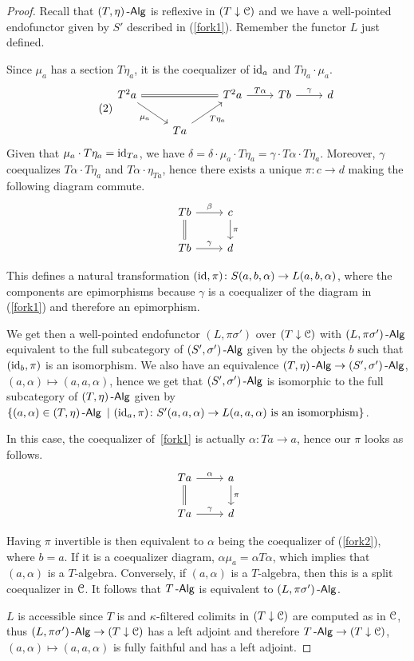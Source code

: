 \documentclass[a4paper,11pt,oneside,openany]{scrbook}
\begin{document}
\begin{proof}
	Recall that $(T,\eta)\operatorname{-\mathsf{Alg}}$ is reflexive in $(T\downarrow\operatorname{\mathcal{C}})$ and we have a well-pointed endofunctor given by $S'$ described in (\ref{fork1}). Remember the functor $L$ just defined.

	Since $\mu_a$ has a section $T\eta_a$, it is the coequalizer of $\operatorname{id}_a$ and $T\eta_a\cdot\mu_a$.
	\[
		\tag{2}\label{fork2}
		\begin{tikzcd}
			T^2a\ar[rr, equal]\ar[dr, swap, "\mu_a"]
			&& T^2a\ar[r, "T\alpha"]
			& Tb\ar[r, "\gamma"]
			& d \\
			& Ta\ar[ur, swap, "T\eta_a"]
		\end{tikzcd}
	\]
	Given that $\mu_a\cdot T\eta_a=\operatorname{id}_{Ta}$, we have $\delta=\delta\cdot\mu_a\cdot T\eta_a=\gamma\cdot T\alpha\cdot T\eta_a$. Moreover, $\gamma$ coequalizes $T\alpha\cdot T\eta_a$ and $T\alpha\cdot\eta_{Ta}$, hence there exists a unique $\pi\colon c\rightarrow d$ making the following diagram commute.
	\[
		\begin{tikzcd}
			Tb\ar[d, equal]\ar[r, "\beta"]
			& c\ar[d, "\pi"] \\
			Tb\ar[r, "\gamma"]
			& d
		\end{tikzcd}
	\]

	This defines a natural transformation $(\operatorname{id},\pi)\colon S(a,b,\alpha)\rightarrow L(a,b,\alpha)$, where the components are epimorphisms because $\gamma$ is a coequalizer of the diagram in (\ref{fork1}) and therefore an epimorphism.

	We get then a well-pointed endofunctor $(L,\pi\sigma')$ over $(T\downarrow\operatorname{\mathcal{C}})$ with $(L,\pi\sigma')\operatorname{-\mathsf{Alg}}$ equivalent to the full subcategory of $(S',\sigma')\operatorname{-\mathsf{Alg}}$ given by the objects $b$ such that $(\operatorname{id}_b,\pi)$ is an isomorphism. We also have an equivalence $(T,\eta)\operatorname{-\mathsf{Alg}}\rightarrow (S',\sigma')\operatorname{-\mathsf{Alg}}$, $(a,\alpha)\mapsto (a,a,\alpha)$, hence we get that $(S',\sigma')\operatorname{-\mathsf{Alg}}$ is isomorphic to the full subcategory of $(T,\eta)\operatorname{-\mathsf{Alg}}$ given by $\{(a,\alpha)\in (T,\eta)\operatorname{-\mathsf{Alg}}\ |\ (\operatorname{id}_a,\pi)\colon S'(a,a,\alpha)\rightarrow L(a,a,\alpha)\text{ is an isomorphism}\}$.

	In this case, the coequalizer of~\ref{fork1} is actually $\alpha\colon Ta\rightarrow a$, hence our $\pi$ looks as follows.
	\[
		\begin{tikzcd}
			Ta\ar[d, equal]\ar[r, "\alpha"]
			& a\ar[d, "\pi"] \\
			Ta\ar[r, "\gamma"]
			& d
		\end{tikzcd}
	\]

	Having $\pi$ invertible is then equivalent to $\alpha$ being the coequalizer of (\ref{fork2}), where $b=a$. If it is a coequalizer diagram, $\alpha\mu_a=\alpha T\alpha$, which implies that $(a,\alpha)$ is a $T$-algebra. Conversely, if $(a,\alpha)$ is a $T$-algebra, then this is a split coequalizer in $\operatorname{\mathcal{C}}$. It follows that $T\operatorname{-\mathsf{Alg}}$ is equivalent to $(L,\pi\sigma')\operatorname{-\mathsf{Alg}}$.

	$L$ is accessible since $T$ is and $\kappa$-filtered colimits in $(T\downarrow\operatorname{\mathcal{C}})$ are computed as in $\operatorname{\mathcal{C}}$, thus $(L,\pi\sigma')\operatorname{-\mathsf{Alg}}\rightarrow(T\downarrow\operatorname{\mathcal{C}})$ has a left adjoint and therefore $T\operatorname{-\mathsf{Alg}}\rightarrow (T\downarrow\operatorname{\mathcal{C}})$, $(a,\alpha)\mapsto(a,a,\alpha)$ is fully faithful and has a left adjoint.
\end{proof}
\end{document}
